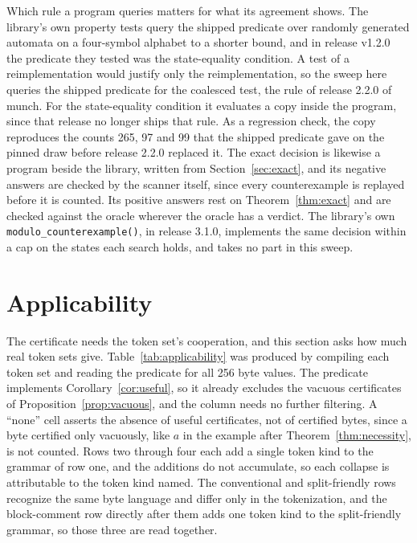 \documentclass[11pt,a4paper]{article}
\theoremstyle{definition}
\theoremstyle{plain}
\newcommand{\code}[1]{\texttt{#1}}
\begin{document}
Which rule a program queries matters for what its agreement shows. The library's own property tests query the shipped
predicate over randomly generated automata on a four-symbol alphabet to a shorter bound, and in release
v1.2.0~\cite{munch} the predicate they tested was the state-equality condition. A test of a reimplementation would
justify only the reimplementation, so the sweep here queries the shipped predicate for the coalesced test, the rule of
release 2.2.0 of munch. For the state-equality condition it evaluates a copy inside the program, since that release no
longer ships that rule. As a regression check, the copy reproduces the counts 265, 97 and 99 that the shipped predicate
gave on the pinned draw before release 2.2.0 replaced it. The exact decision is likewise a program beside the library,
written from Section~\ref{sec:exact}, and its negative answers are checked by the scanner itself, since every
counterexample is replayed before it is counted. Its positive answers rest on Theorem~\ref{thm:exact} and are checked
against the oracle wherever the oracle has a verdict. The library's own \code{modulo\_counterexample()}, in release
3.1.0, implements the same decision within a cap on the states each search holds, and takes no part in this sweep.

\section{Applicability}
\label{sec:applicability}

The certificate needs the token set's cooperation, and this section asks how much real token sets give.
Table~\ref{tab:applicability} was produced by compiling each token set and reading the predicate for all 256 byte
values. The predicate implements Corollary~\ref{cor:useful}, so it already excludes the vacuous certificates of
Proposition~\ref{prop:vacuous}, and the column needs no further filtering. A ``none'' cell asserts the absence of useful
certificates, not of certified bytes, since a byte certified only vacuously, like $a$ in the example after
Theorem~\ref{thm:necessity}, is not counted. Rows two through four each add a single token kind to the grammar of row
one, and the additions do not accumulate, so each collapse is attributable to the token kind named. The conventional and
split-friendly rows recognize the same byte language and differ only in the tokenization, and the block-comment row
directly after them adds one token kind to the split-friendly grammar, so those three are read together.
\end{document}
